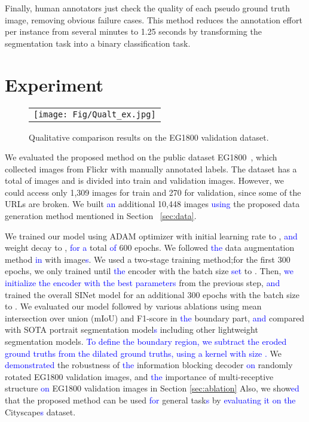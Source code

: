 \documentclass[10pt,twocolumn,letterpaper]{article}
\newcommand\Lars[1]{\textcolor{blue}{#1}}
\newcommand\Lars[1]{#1}
\begin{document}
Finally, human annotators just check the quality of each pseudo ground truth image, removing obvious failure cases. 
This method reduces the annotation effort per instance from several minutes to 1.25 seconds by transforming the segmentation task into a binary classification task.

 
\section{Experiment}
\label{sec:exp}

\begin{figure*}[t]
\begin{center}
\begin{tabular}{c}
    \texttt{[image: Fig/Qualt\_ex.jpg]}  \\ 
        \end{tabular}\end{center}
\vspace{-4mm}
   \caption{Qualitative comparison results on the EG1800 validation dataset.}
\label{fig:ex}
\end{figure*}


We evaluated the proposed method on the public dataset EG1800~\cite{shen2016automatic}, which collected images from Flickr with manually annotated labels.
The dataset has a total of  images and is divided into  train and  validation images.
However, we could access only 1,309 images for train and 270 for validation, since some of the URLs are broken. 
We built \Lars{an} additional 10,448 images \Lars{using} the proposed data generation method mentioned in Section ~\ref{sec:data}.

We trained our model using ADAM optimizer with initial learning rate to , \Lars{and} weight decay to , \Lars{for a} total \Lars{of} 600 epochs.
We followed \Lars{the} data augmentation method \Lars{in} \cite{zhang2019portraitnet} with  image\Lars{s}.
We used a two-stage training method;for the first 300 epochs, we only trained until \Lars{the} encoder with the batch size \Lars{set} to .
Then, \Lars{we initialize the encoder with the best parameters }from the previous step, \Lars{and} trained the overall SINet model for an additional 300 epochs with the batch size to .
We evaluated our model followed by various ablations using mean intersection over union (mIoU) and F1-score in \Lars{the} boundary part, \Lars{and} compared with SOTA portrait segmentation model\Lars{s} including other lightweight segmentation models.
\Lars{To define the boundary region, we subtract the eroded ground truths from the dilated ground truths, using a kernel with size . } 
We \Lars{demonstrated} the robustness of \Lars{the} information blocking decoder \Lars{on} randomly rotated EG1800 validation images, and \Lars{the} importance of multi-receptive structure \Lars{on} EG1800 validation images in Section \ref{sec:ablation}
Also, we show\Lars{ed} that the proposed method can be used \Lars{for} general task\Lars{s} by \Lars{evaluating it on the} Cityscape\Lars{s} dataset.
\end{document}
